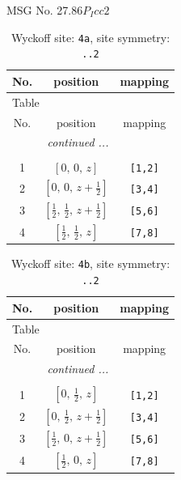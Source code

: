 \documentclass[fleqn,8pt]{jsarticle}
\begin{document}
\setcounter{MaxMatrixCols}{32}

\renewcommand{\tablename}{Table~}
\renewcommand{\figurename}{Figure~}
\begin{center}
\LARGE
MSG No. 27.86\quad$P_{I}cc2$
\end{center}
\renewcommand{\arraystretch}{1.2}
\begin{longtable}{ccc}
\caption{Wyckoff site: {\tt 4a}, site symmetry: {\tt ..2}}
 \\
 \hline \hline
No. & position & mapping \\ \hline \endfirsthead

\multicolumn{2}{l}{\tablename\ \thetable{}} \\
 \hline \hline
No. & position & mapping \\ \hline \endhead

 \hline \hline
\multicolumn{2}{r}{\footnotesize\it continued ...} \\ \endfoot

 \hline \hline
\multicolumn{2}{r}{} \\ \endlastfoot

1 & $\left[ 0,\, 0,\, z \right]$ & {\tt [1,2]} \\ \hline
2 & $\left[ 0,\, 0,\, z + \frac{1}{2} \right]$ & {\tt [3,4]} \\ \hline
3 & $\left[ \frac{1}{2},\, \frac{1}{2},\, z + \frac{1}{2} \right]$ & {\tt [5,6]} \\ \hline
4 & $\left[ \frac{1}{2},\, \frac{1}{2},\, z \right]$ & {\tt [7,8]} \\
\end{longtable}
\renewcommand{\arraystretch}{1.2}
\begin{longtable}{ccc}
\caption{Wyckoff site: {\tt 4b}, site symmetry: {\tt ..2}}
 \\
 \hline \hline
No. & position & mapping \\ \hline \endfirsthead

\multicolumn{2}{l}{\tablename\ \thetable{}} \\
 \hline \hline
No. & position & mapping \\ \hline \endhead

 \hline \hline
\multicolumn{2}{r}{\footnotesize\it continued ...} \\ \endfoot

 \hline \hline
\multicolumn{2}{r}{} \\ \endlastfoot

1 & $\left[ 0,\, \frac{1}{2},\, z \right]$ & {\tt [1,2]} \\ \hline
2 & $\left[ 0,\, \frac{1}{2},\, z + \frac{1}{2} \right]$ & {\tt [3,4]} \\ \hline
3 & $\left[ \frac{1}{2},\, 0,\, z + \frac{1}{2} \right]$ & {\tt [5,6]} \\ \hline
4 & $\left[ \frac{1}{2},\, 0,\, z \right]$ & {\tt [7,8]} \\
\end{longtable}
\end{document}

